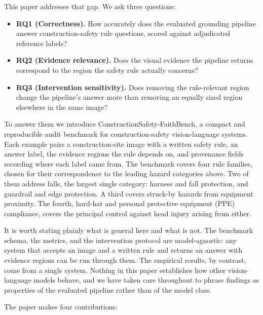 \documentclass[conference]{IEEEtran}
\begin{document}
This paper addresses that gap. We ask three questions:

\begin{itemize}
\item \textbf{RQ1 (Correctness).} How accurately does the evaluated grounding pipeline answer construction-safety rule questions, scored against adjudicated reference labels?
\item \textbf{RQ2 (Evidence relevance).} Does the visual evidence the pipeline returns correspond to the region the safety rule actually concerns?
\item \textbf{RQ3 (Intervention sensitivity).} Does removing the rule-relevant region change the pipeline's answer more than removing an equally sized region elsewhere in the same image?
\end{itemize}

To answer them we introduce ConstructionSafety-FaithBench, a compact and reproducible audit benchmark for construction-safety vision-language systems. Each example pairs a construction-site image with a written safety rule, an answer label, the evidence regions the rule depends on, and provenance fields recording where each label came from. The benchmark covers four rule families, chosen for their correspondence to the leading hazard categories above. Two of them address falls, the largest single category: harness and fall protection, and guardrail and edge protection. A third covers struck-by hazards from equipment proximity. The fourth, hard-hat and personal protective equipment (PPE) compliance, covers the principal control against head injury arising from either.

It is worth stating plainly what is general here and what is not. The benchmark schema, the metrics, and the intervention protocol are model-agnostic: any system that accepts an image and a written rule and returns an answer with evidence regions can be run through them. The empirical results, by contrast, come from a single system. Nothing in this paper establishes how other vision-language models behave, and we have taken care throughout to phrase findings as properties of the evaluated pipeline rather than of the model class.

The paper makes four contributions:
\end{document}
